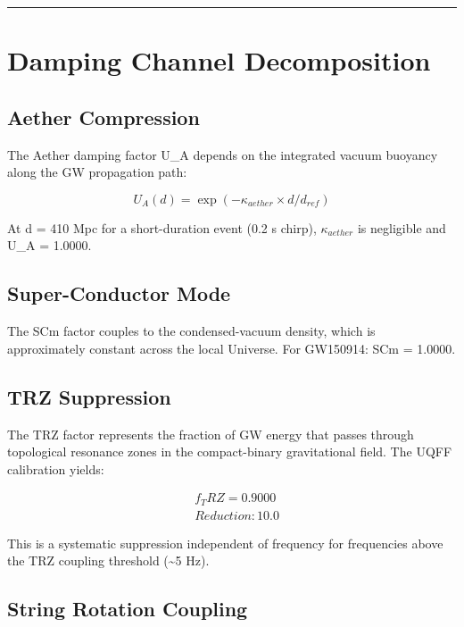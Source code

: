 \documentclass[12pt,a4paper]{article}
\begin{document}
\medskip\hrule\medskip

\section{Damping Channel Decomposition}

\subsection{Aether Compression}

The Aether damping factor U\_A depends on the integrated vacuum buoyancy along the GW propagation path:

\begin{equation}
U_A(d) = \exp(-\kappa_{aether} \times d / d_{ref})
\end{equation}

At d = 410 Mpc for a short-duration event (0.2 s chirp), $\kappa_{aether}$ is negligible and U\_A = 1.0000.

\subsection{Super-Conductor Mode}

The SCm factor couples to the condensed-vacuum density, which is approximately constant across the local Universe. For GW150914: SCm = 1.0000.

\subsection{TRZ Suppression}

The TRZ factor represents the fraction of GW energy that passes through topological resonance zones in the compact-binary gravitational field. The UQFF calibration yields:

\begin{equation}
\begin{aligned}
  & f_TRZ = 0.9000 \\
  & Reduction: 10.0%
\end{aligned}
\end{equation}

This is a systematic suppression independent of frequency for frequencies above the TRZ coupling threshold (\textasciitilde{}5 Hz).

\subsection{String Rotation Coupling}
\end{document}
